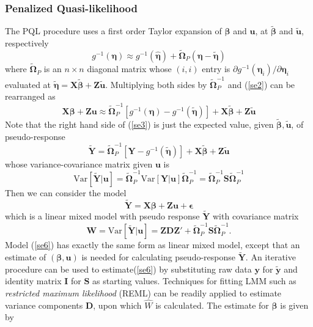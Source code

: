 	\subsubsection{Penalized Quasi-likelihood}
	The PQL procedure uses a first order Taylor expansion of $\bm \beta$ and $\bm u$, at $\tilde{\bm \beta} $ and $ \tilde{\bm u} $, respectively
	\begin{equation}\label{se2}
	g^{-1}(\bm\eta) \approx g^{-1}(\hat{\bm \eta}) + \tilde{\bm \Omega}_P(\bm \eta-\tilde{\bm \eta})
	\end{equation} 
	where $\tilde{\bm \Omega}_P$ is an $n\times n$ diagonal matrix whose $(i, i)$ entry is  $\partial {g^{-1}(\bm \eta_i)}/\partial \bm \eta_i $ evaluated at $\tilde{\bm \eta}= \bm X\tilde{\bm \beta} + \bm Z\tilde{\bm u}$. Multiplying both sides by $\bm \tilde{\Omega}_P^{-1}$ and (\ref{se2}) can be rearranged as 
	\begin{equation}\label{se3}
	\bm {X\beta} + \bm {Zu} \approx \tilde{\bm \Omega}_P^{-1}[g^{-1}(\bm\eta)- g^{-1}(\tilde{\bm \eta})]  + \bm{X}\tilde{\bm \beta} + \bm Z\tilde{\bm u}
	\end{equation}
	Note that the right hand side of (\ref{se3}) is just the expected value, given $\tilde{\bm \beta}, \tilde{\bm u}$, of	 pseudo-response 
	\begin{equation}\label{se4}
	\tilde{\bm Y }=\tilde{\bm \Omega}_P^{-1}[\bm Y- g^{-1}(\tilde{\bm \eta})]  + \bm{X}\tilde{\bm \beta} + \bm Z\tilde{\bm u}
	\end{equation}
	whose variance-covariance matrix given $\bm u$ is 
	\begin{equation}\label{se5}
	\text{Var}[\tilde{\bm Y }|\bm u] =\tilde{\bm \Omega}_P^{-1} \text{Var}[\bm Y|\bm u]\tilde{\bm \Omega}_P^{-1} = 
	\tilde{\bm \Omega}_P^{-1} \bm S \tilde{\bm \Omega}_P^{-1}
	\end{equation}
	Then we can consider the model 
	\begin{equation}\label{se6}
	\tilde{\bm Y } = \bm{X\beta} + \bm {Zu}  + \bm \epsilon
	\end{equation}
	which is a linear mixed model with pseudo response $\tilde{\bm Y }$ with covariance matrix 
	\begin{equation}
	\bm W = \text{Var}[ \tilde{\bm Y } |\bm u] = \bm{ZDZ'} + \tilde{\bm \Omega}_P^{-1} \bm S \tilde{\bm \Omega}_P^{-1}.
	\end{equation}
	Model (\ref{se6})  has exactly the same form as linear mixed model, except that an estimate of $(\bm\beta, \bm u)$  is needed for calculating pseudo-response $\tilde{\bm Y }$. An iterative procedure can be used to estimate(\ref{se6}) by substituting raw data $\bm y$ for $\tilde{\bm y}$  and identity matrix $\bm I$ for $\bm S$ as starting values. Techniques for fitting LMM such as \textit{restricted maximum likelihood} (REML) can be readily applied to estimate variance components $\bm D$, upon which $\hat{W}$ is calculated. The estimate for $\bm \beta$ is given by
